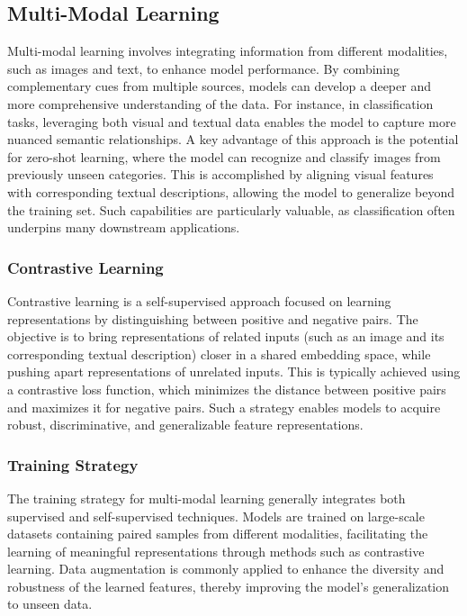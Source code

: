 \subsection{Multi-Modal Learning}
\label{subsec:multi_modal_learning}
Multi-modal learning involves integrating information from different modalities, such as images and text, to enhance model performance. By combining complementary cues from multiple sources, models can develop a deeper and more comprehensive understanding of the data. For instance, in classification tasks, leveraging both visual and textual data enables the model to capture more nuanced semantic relationships. A key advantage of this approach is the potential for zero-shot learning, where the model can recognize and classify images from previously unseen categories. This is accomplished by aligning visual features with corresponding textual descriptions, allowing the model to generalize beyond the training set. Such capabilities are particularly valuable, as classification often underpins many downstream applications.

\subsubsection{Contrastive Learning}
\label{subsec:contrastive_learning}
Contrastive learning is a self-supervised approach focused on learning representations by distinguishing between positive and negative pairs. The objective is to bring representations of related inputs (such as an image and its corresponding textual description) closer in a shared embedding space, while pushing apart representations of unrelated inputs. This is typically achieved using a contrastive loss function, which minimizes the distance between positive pairs and maximizes it for negative pairs. Such a strategy enables models to acquire robust, discriminative, and generalizable feature representations.

\subsubsection{Training Strategy}
\label{subsec:training_strategy}
The training strategy for multi-modal learning generally integrates both supervised and self-supervised techniques. Models are trained on large-scale datasets containing paired samples from different modalities, facilitating the learning of meaningful representations through methods such as contrastive learning. Data augmentation is commonly applied to enhance the diversity and robustness of the learned features, thereby improving the model's generalization to unseen data.

